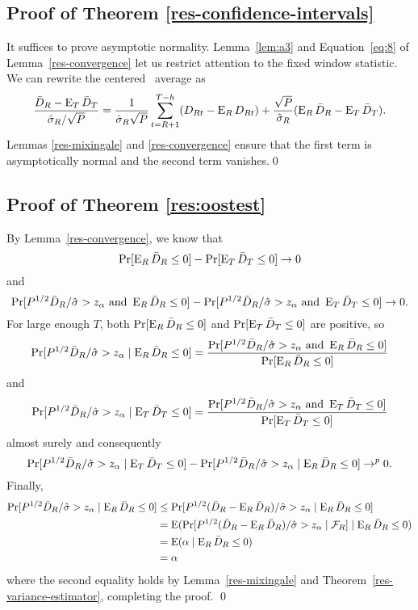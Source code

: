 \documentclass[11pt]{article}
\begin{document}
\subsection*{Proof of Theorem \ref{res-confidence-intervals}}

It suffices to prove asymptotic normality.  Lemma~\ref{lem:a3} and
Equation~\eqref{eq:8} of Lemma~\ref{res-convergence} let us restrict
attention to the fixed window statistic.  We can rewrite the centered
\oos\ average as
\[
\frac{\bar{D}_{R} - \operatorname{E}_T \bar{D}_T}{\hat\sigma_R / \sqrt{P}} =
\frac{1}{\hat\sigma_R \sqrt{P}}\sum_{t=R+1}^{T-h} (D_{Rt} - \operatorname{E}_R D_{Rt}) +
\frac{\sqrt{P}}{\hat\sigma_R} (\operatorname{E}_R\bar{D}_{R} - \operatorname{E}_T\bar{D}_{T}).
\]
Lemmas \ref{res-mixingale} and 
\ref{res-convergence} ensure that the first term is asymptotically
normal and the second term vanishes.\qed

\subsection*{Proof of Theorem \ref{res:oostest}}
By Lemma~\ref{res-convergence}, we know that
\begin{equation*}
  \Pr[\operatorname{E}_R \bar{D}_{R} \leq 0] - \Pr[\operatorname{E}_T \bar{D}_{T} \leq 0] \to 0
\end{equation*}
and
\begin{equation*}
  \Pr[P^{1/2} \bar{D}_{R} / \hat\sigma > z_\alpha \text{ and } \operatorname{E}_R \bar{D}_{R} \leq 0]
  - \Pr[P^{1/2} \bar{D}_{R} / \hat\sigma > z_\alpha \text{ and } 
  \operatorname{E}_T \bar{D}_{T} \leq 0] \to 0.
\end{equation*}
For large enough $T$, both $\Pr[\operatorname{E}_R \bar{D}_{R} \leq 0]$ and $\Pr[\operatorname{E}_T
\bar{D}_{T} \leq 0]$ are positive, so
\begin{equation*}
  \Pr[P^{1/2} \bar{D}_{R} / \hat\sigma > z_\alpha
  \mid \operatorname{E}_R \bar{D}_{R} \leq 0] = 
  \frac{\Pr[P^{1/2} \bar{D}_{R} / \hat\sigma > z_\alpha \text{ and }
    \operatorname{E}_R \bar{D}_{R} \leq 0]}{\Pr[\operatorname{E}_R \bar{D}_{R} \leq 0]}
\end{equation*}
and
\begin{equation*}
  \Pr[P^{1/2} \bar{D}_{R} / \hat\sigma > z_\alpha
  \mid \operatorname{E}_T \bar{D}_{T} \leq 0] = 
  \frac{\Pr[P^{1/2} \bar{D}_{R} / \hat\sigma > z_\alpha \text{ and }
    \operatorname{E}_T \bar{D}_{T} \leq 0]}{\Pr[\operatorname{E}_T \bar{D}_{T} \leq 0]}
\end{equation*}
almost surely and consequently
\begin{equation*}
  \Pr[P^{1/2} \bar{D}_{R} / \hat\sigma > z_\alpha
  \mid \operatorname{E}_T \bar{D}_{T} \leq 0]
  - \Pr[P^{1/2} \bar{D}_{R} / \hat\sigma > z_\alpha
  \mid \operatorname{E}_R \bar{D}_{R} \leq 0] \to^p 0.
\end{equation*}
Finally,
\begin{align*}
  \Pr[P^{1/2} \bar{D}_{R} / \hat\sigma > z_\alpha \mid \operatorname{E}_R \bar{D}_{R} \leq 0]
  &\leq \Pr[P^{1/2} (\bar{D}_{R} - \operatorname{E}_R \bar{D}_{R}) / \hat\sigma > z_\alpha 
  \mid \operatorname{E}_R \bar{D}_{R} \leq 0] \\
  &= \operatorname{E}( \Pr[P^{1/2} (\bar{D}_{R} - \operatorname{E}_R \bar{D}_{R}) / \hat\sigma > z_\alpha 
  \mid \mathcal{F}_R] \mid \operatorname{E}_R \bar{D}_{R} \leq 0) \\
  &= \operatorname{E}(\alpha \mid \operatorname{E}_R \bar{D}_{R} \leq 0) \\
  &= \alpha
\end{align*}
where the second equality holds by Lemma~\ref{res-mixingale} and
Theorem~\ref{res-variance-estimator}, completing the proof.
\qed
\end{document}
